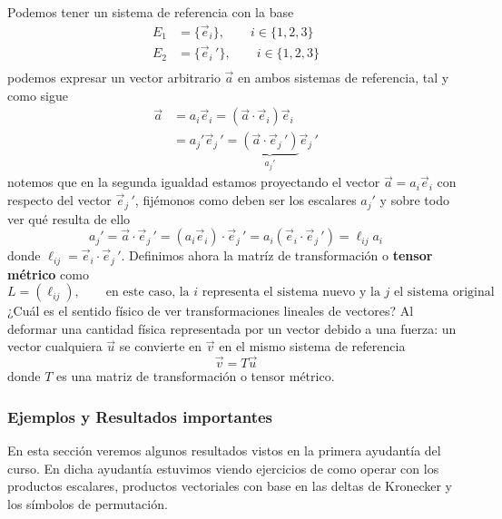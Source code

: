 \documentclass[11pt,a4paper]{article}
\begin{document}
Podemos tener un sistema de referencia con la base 
\begin{align*}
E_1&=\{\vec{e}_i\},\qquad i\in\{1,2,3\}\\
E_2&=\{\vec{e}_i\, '\},\qquad i\in\{1,2,3\}\\
\end{align*}
podemos expresar un vector arbitrario $\vec{a}$ en ambos sistemas de referencia, tal y como sigue
\begin{align*}
\vec{a}&=a_i\vec{e}_i=(\vec{a}\cdot\vec{e}_i)\vec{e}_i\\
&=a_j'\vec{e}_j\, '=\underbrace{(\vec{a}\cdot\vec{e}_j\, ')}_{a_j'}\vec{e}_j\, '
\end{align*}
notemos que en la segunda igualdad estamos proyectando el vector $\vec{a}=a_i\vec{e}_i$ con respecto del vector $\vec{e}_j\, '$, fijémonos como deben ser los escalares $a_j'$ y sobre todo ver qué resulta de ello
$$a_j'=\vec{a}\cdot\vec{e}_j\, '=(a_i\vec{e}_i)\cdot\vec{e}_j\, '=a_i(\vec{e}_i\cdot\vec{e}_j\, ')=\ell_{ij}a_i$$
donde $\ell_{ij}=\vec{e}_i\cdot\vec{e}_j\, '$. Definimos ahora la matríz de transformación o \textbf{tensor métrico} como 
$$L=(\ell_{ij}),\qquad \text{en este caso, la $i$ representa el sistema nuevo y la $j$ el sistema original}$$
¿Cuál es el sentido físico de ver transformaciones lineales de vectores? Al deformar una cantidad física representada por un vector debido a una fuerza: un vector cualquiera $\vec{u}$ se convierte en $\vec{v}$ en el mismo sistema de referencia
$$\vec{v}=T\vec{u}$$
donde $T$ es una matriz de transformación o tensor métrico.

\subsubsection{Ejemplos y Resultados importantes}

En esta sección veremos algunos resultados vistos en la primera ayudantía del curso. En dicha ayudantía estuvimos viendo ejercicios de como operar con los productos escalares, productos vectoriales con base en las deltas de Kronecker y los símbolos de permutación.
\end{document}
